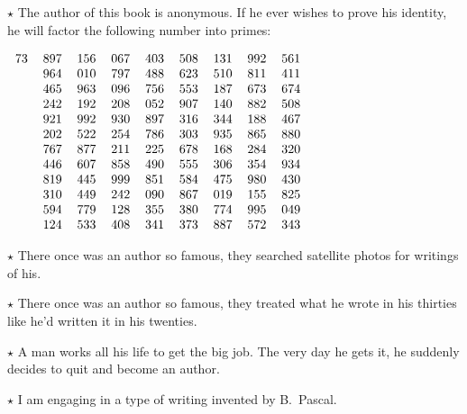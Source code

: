 \documentclass[oneside]{book}
\begin{document}
$\star$ The author of this book is anonymous.  If he ever wishes to prove his identity,
he will factor the following number into primes:

{
\centering
$
\begin{tabular}{rllllllll}
73 &897 &156 &067 &403 &508 &131 &992 &561 \\
{} &964 &010 &797 &488 &623 &510 &811 &411\\
{} &465 &963 &096 &756 &553 &187 &673 &674\\
{} &242 &192 &208 &052 &907 &140 &882 &508\\
{} &921 &992 &930 &897 &316 &344 &188 &467\\
{} &202 &522 &254 &786 &303 &935 &865 &880\\
{} &767 &877 &211 &225 &678 &168 &284 &320\\
{} &446 &607 &858 &490 &555 &306 &354 &934\\
{} &819 &445 &999 &851 &584 &475 &980 &430\\
{} &310 &449 &242 &090 &867 &019 &155 &825\\
{} &594 &779 &128 &355 &380 &774 &995 &049\\
{} &124 &533 &408 &341 &373 &887 &572 &343
\end{tabular}
$
\par
}

$\star$ There once was an author so famous, they searched satellite photos for writings of his.




$\star$ There once was an author so famous, they treated what he wrote in his thirties
like he'd written it in his twenties.

$\star$ A man works all his life to get the big job.  The very day he gets it, he suddenly
decides to quit and become an author.

$\star$ I am engaging in a type of writing invented by B.~Pascal.

\end{document}
